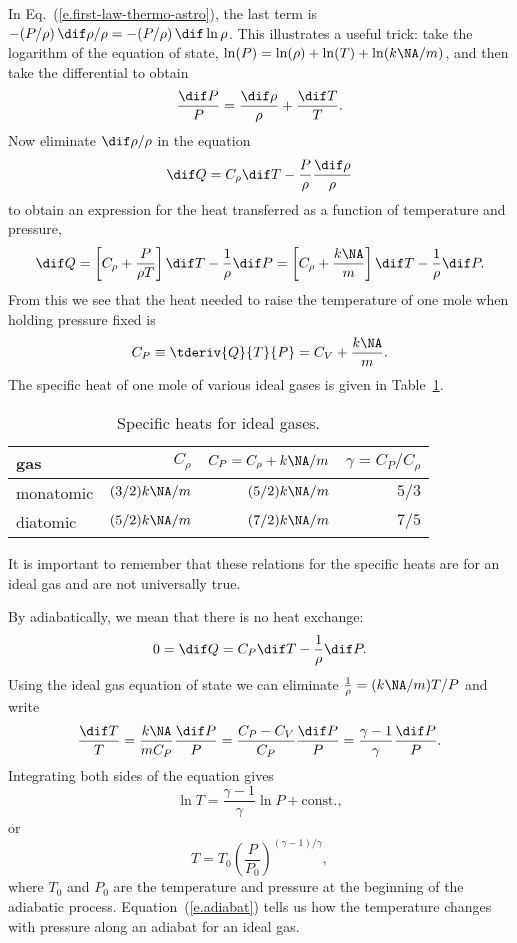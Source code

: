 In Eq.~(\ref{e.first-law-thermo-astro}), the last term is $-(P/\rho)\, \dif\rho/\rho = -(P/\rho)\,\dif\ln\rho$. This illustrates a useful trick: take the logarithm of the equation of state, $\ln (P) = \ln(\rho) + \ln (T) + \ln (k\NA/m)$, and then take the differential to obtain
\[ \frac{\dif P}{P} = \frac{\dif\rho}{\rho} + \frac{\dif T}{T}. \]
Now eliminate $\dif\rho/\rho$ in the equation
\[ \dif Q = C_{\rho}\dif T - \frac{P}{\rho}\frac{\dif\rho}{\rho} \]
to obtain an expression for the heat transferred as a function of temperature and pressure,
\[ \dif Q = \left[C_{\rho} + \frac{P}{\rho T}\right]\dif T - \frac{1}{\rho}\dif P
	 = \left[C_{\rho} + \frac{k\NA}{m}\right]\dif T - \frac{1}{\rho}\dif P. \]
From this we see that the heat needed to raise the temperature of one mole when holding pressure fixed is
\begin{equation}\label{e.CP}
C_{P}\equiv \tderiv{Q}{T}{P} = C_{V} + \frac{k\NA}{m}.
\end{equation}
The specific heat of one mole of various ideal gases is given in Table~\ref{t.specific-heat}.
\begin{table}
\caption{Specific heats for ideal gases.\label{t.specific-heat}}
\begin{tabular}{lrrr}
gas & $C_{\rho}$ & $C_{P}=C_{\rho}+k\NA/m$ & $\gamma = C_{P}/C_{\rho}$\\
\hline
monatomic & $(3/2) k\NA/m$ & $(5/2)k\NA/m$ & $5/3$\\
diatomic & $(5/2) k\NA/m$ & $(7/2)k\NA/m$ & $7/5$\\
\end{tabular}
\end{table}
It is important to remember that these relations for the specific heats are for an ideal gas and are not universally true.

  By adiabatically, we mean that there is no heat exchange:
\[ 0 = \dif Q = C_{P}\dif T - \frac{1}{\rho} \dif P.\]
Using the ideal gas equation of state we can eliminate $\frac{1}{\rho} = (k\NA/m) T/P$ and write
\[ \frac{\dif T}{T} = \frac{k\NA}{mC_{P}} \frac{\dif P}{P} = \frac{C_{P}-C_{V}}{C_{P}} \frac{\dif P}{P} = \frac{\gamma-1}{\gamma}\frac{\dif P}{P}. \]
Integrating both sides of the equation gives
\[ \ln T = \frac{\gamma-1}{\gamma}\ln P + \textrm{const.},\]
or 
\begin{equation}\label{e.adiabat}
 T = T_{0}\left(\frac{P}{P_{0}}\right)^{(\gamma-1)/\gamma},
\end{equation}
where $T_{0}$ and $P_{0}$ are the temperature and pressure at the beginning of the adiabatic process.
Equation~(\ref{e.adiabat}) tells us how the temperature changes with pressure along an adiabat for an ideal gas.


